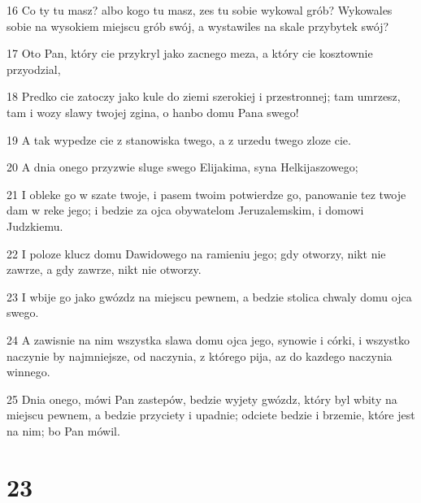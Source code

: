 \par 16 Co ty tu masz? albo kogo tu masz, zes tu sobie wykowal grób? Wykowales sobie na wysokiem miejscu grób swój, a wystawiles na skale przybytek swój?
\par 17 Oto Pan, który cie przykryl jako zacnego meza, a który cie kosztownie przyodzial,
\par 18 Predko cie zatoczy jako kule do ziemi szerokiej i przestronnej; tam umrzesz, tam i wozy slawy twojej zgina, o hanbo domu Pana swego!
\par 19 A tak wypedze cie z stanowiska twego, a z urzedu twego zloze cie.
\par 20 A dnia onego przyzwie sluge swego Elijakima, syna Helkijaszowego;
\par 21 I obleke go w szate twoje, i pasem twoim potwierdze go, panowanie tez twoje dam w reke jego; i bedzie za ojca obywatelom Jeruzalemskim, i domowi Judzkiemu.
\par 22 I poloze klucz domu Dawidowego na ramieniu jego; gdy otworzy, nikt nie zawrze, a gdy zawrze, nikt nie otworzy.
\par 23 I wbije go jako gwózdz na miejscu pewnem, a bedzie stolica chwaly domu ojca swego.
\par 24 A zawisnie na nim wszystka slawa domu ojca jego, synowie i córki, i wszystko naczynie by najmniejsze, od naczynia, z którego pija, az do kazdego naczynia winnego.
\par 25 Dnia onego, mówi Pan zastepów, bedzie wyjety gwózdz, który byl wbity na miejscu pewnem, a bedzie przyciety i upadnie; odciete bedzie i brzemie, które jest na nim; bo Pan mówil.

\chapter{23}

